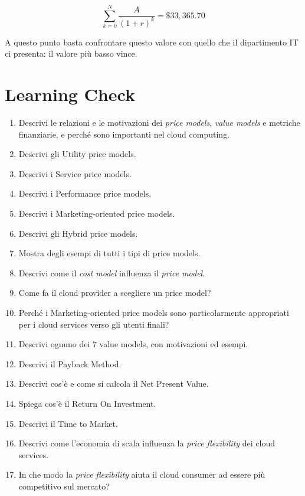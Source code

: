 \[ \sum_{k=0}^{N} \frac{A}{(1 + r)^{k}} = \$33,365.70 \]


A questo punto basta confrontare questo valore con quello che il dipartimento IT ci presenta: il valore più basso vince.

\section{Learning Check}
\begin{enumerate}
    \item Descrivi le relazioni e le motivazioni dei \textit{price models}, \textit{value models} e metriche finanziarie, e perché sono importanti nel cloud computing.
    \item Descrivi gli Utility price models.
    \item Descrivi i Service price models.
    \item Descrivi i Performance price models.
    \item Descrivi i Marketing-oriented price models.
    \item Descrivi gli Hybrid price models.
    \item Mostra degli esempi di tutti i tipi di price models.
    \item Descrivi come il \textit{cost model} influenza il \textit{price model}.
    \item Come fa il cloud provider a scegliere un price model?
    \item Perché i Marketing-oriented price models sono particolarmente appropriati per i cloud services verso gli utenti finali?
    \item Descrivi ognuno dei 7 value models, con motivazioni ed esempi.
    \item Descrivi il Payback Method.
    \item Descrivi cos'è e come si calcola il Net Present Value.
    \item Spiega cos'è il Return On Investment.
    \item Descrivi il Time to Market.
    \item Descrivi come l'economia di scala influenza la \textit{price flexibility} dei cloud services.
    \item In che modo la \textit{price flexibility} aiuta il cloud consumer ad essere più competitivo sul mercato?
\end{enumerate}

